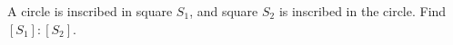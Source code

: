 A circle is inscribed in square $S_1$, and square $S_2$ is inscribed in the circle. Find $[S_1]:[S_2]$.
